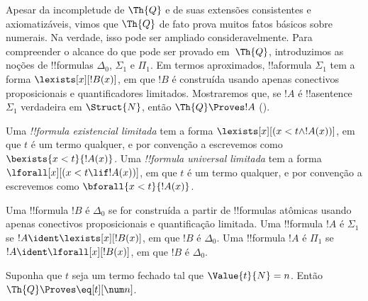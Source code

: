 \documentclass[../../../include/open-logic-section]{subfiles}
\begin{document}

Apesar da incompletude de $\Th{Q}$ e de suas extensões consistentes e
axiomatizáveis, vimos que $\Th{Q}$ de fato prova muitos fatos básicos
sobre numerais. Na verdade, isso pode ser ampliado consideravelmente.
Para compreender o alcance do que pode ser provado em~$\Th{Q}$,
introduzimos as noções de !!{formula}s $\Delta_0$, $\Sigma_1$ e
$\Pi_1$. Em termos aproximados, !!a{formula} $\Sigma_1$ tem a forma
$\lexists[x][!B(x)]$, em que $!B$ é construída usando apenas conectivos
proposicionais e quantificadores limitados. Mostraremos que, se $!A$ é
!!a{sentence} $\Sigma_1$ verdadeira em $\Struct{N}$, então
$\Th{Q} \Proves !A$
().

\begin{defn}
Uma \emph{!!{formula} existencial limitada} tem a forma
$\lexists[x][(x < t \land !A(x))]$, em que $t$ é um termo qualquer, e
por convenção a escrevemos como $\bexists{x < t}{!A(x)}$.
%
Uma \emph{!!{formula} universal limitada} tem a forma
$\lforall[x][(x < t \lif !A(x))]$, em que $t$ é um termo qualquer, e
por convenção a escrevemos como $\bforall{x < t}{!A(x)}$.
\end{defn}

\begin{defn}
Uma !!{formula} $!B$ é $\Delta_0$ se for construída a partir de
!!{formula}s atômicas usando apenas conectivos proposicionais e
quantificação limitada.
%
Uma !!{formula} $!A$ é $\Sigma_1$ se
$!A \ident \lexists[x][!B(x)]$, em que $!B$ é $\Delta_0$.
%
Uma !!{formula} $!A$ é $\Pi_1$ se $!A \ident \lforall[x][!B(x)]$, em
que $!B$ é $\Delta_0$.
\end{defn}

\begin{lem}
 Suponha que $t$ seja um termo fechado
tal que $\Value{t}{N} = n$. Então $\Th{Q} \Proves \eq[t][\num n]$.
\end{lem}
\end{document}
